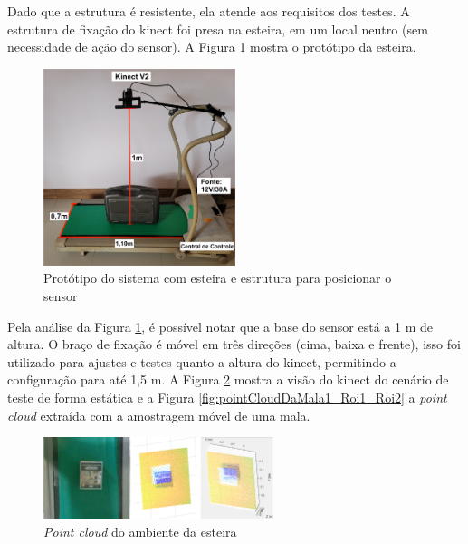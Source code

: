     Dado que a estrutura é resistente, ela atende aos requisitos dos testes. A estrutura de fixação do kinect foi presa na esteira, em um local neutro (sem necessidade de ação do sensor). A Figura \ref{fig:prototipoEsteira} mostra o protótipo da esteira.
    
        \begin{figure}[h]
           \centering
           \includegraphics[width=0.5\textwidth]{imagens/prototipoEsteiraV5_.png}
           \caption{Protótipo do sistema com esteira e estrutura para posicionar o sensor}
          \label{fig:prototipoEsteira}
        \end{figure}

    Pela análise da Figura \ref{fig:prototipoEsteira}, é possível notar que a base do sensor está a 1 m de altura. O braço de fixação é móvel em três direções (cima, baixa e frente), isso foi utilizado para ajustes e testes quanto a altura do kinect, permitindo a configuração para até 1,5 m. A Figura \ref{fig:pointCloudDoAmbienteDaEsteira} mostra a visão do kinect do cenário de teste de forma estática e a Figura \ref{fig:pointCloudDaMala1_Roi1_Roi2} a \textit{point cloud} extraída com a amostragem móvel de uma mala.


        \begin{figure}[h]
           \centering
           \includegraphics[width=0.6\textwidth]{imagens/pointCloudDoAmbienteDaEsteira_v2.png}
           \caption{\textit{Point cloud} do ambiente da esteira}
          \label{fig:pointCloudDoAmbienteDaEsteira}
        \end{figure}


